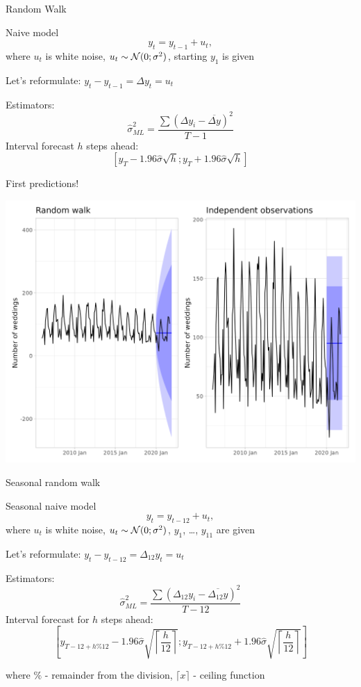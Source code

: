 \begin{frame}{Random Walk}
	
	\begin{block}{Naive model}
		\[
		y_t = y_{t-1} + u_t,
		\]
		where $u_t$ is white noise, $u_t \sim \mathcal{N}(0;\sigma^2)$, starting $y_1$ is given
	\end{block}
	\pause
	Let's reformulate: $y_t - y_{t-1} = \Delta y_t = u_t$
	
	
	\pause
	\alert{Estimators:}
	\[
	\hat\sigma^2_{ML} = \frac{\sum(\Delta y_i - \overline {\Delta y})^2}{T - 1}
	\]
	\pause
	\alert{Interval forecast} $h$ \alert{steps} ahead:
	\[
	[y_T - 1.96 \hat \sigma \sqrt{h}; y_T + 1.96 \hat \sigma \sqrt{h}]
	\]
\end{frame}

\begin{frame}{First predictions!}
	
	\includegraphics[width=\textwidth]{pictures/om_ts_01-157.png}
	
\end{frame}


\begin{frame}{Seasonal random walk}
	
	\begin{block}{Seasonal naive model}
		\[
		y_t = y_{t-12} + u_t,
		\]
		where $u_t$ is white noise, $u_t \sim \mathcal{N}(0;\sigma^2)$, $y_1$, \ldots, $y_{11}$ are given
	\end{block}
	\pause
	Let's reformulate: $y_t - y_{t-12} = \Delta_{12} y_t = u_t$
	\pause
	
	\alert{Estimators:}
	\[
	\hat\sigma^2_{ML} = \frac{\sum(\Delta_{12} y_i - \overline {\Delta_{12} y})^2}{T - 12}
	\]
	\pause
	\alert{Interval forecast} for $h$ \alert{steps} ahead:
	\[
	\left[y_{T-12+h\%12} - 1.96 \hat \sigma \sqrt{\left\lceil \frac{h}{12} \right\rceil}; y_{T-12+h\%12} + 1.96 \hat \sigma \sqrt{\left\lceil \frac{h}{12} \right\rceil}\right]
	\]
	
	where $\%$ - remainder from the division, $\lceil x \rceil$ - ceiling function
 	
	
\end{frame}
	
